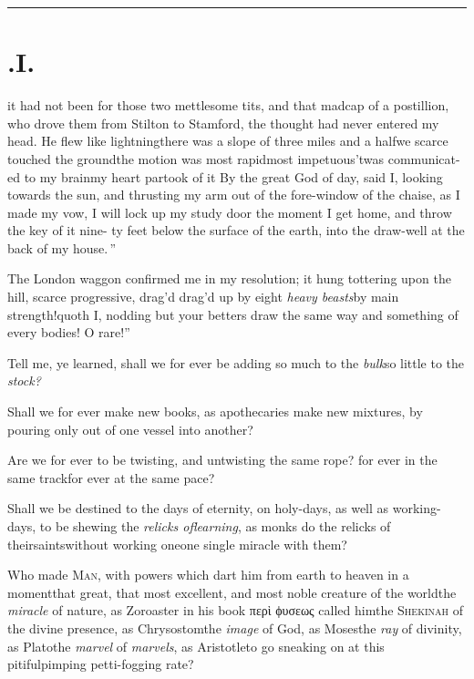 \documentclass{article}
\begin{document}
\bigskip

\hrule

\section{.\enspace  I.}

 it had not been for those two\break
mettlesome tits, and that madcap of\break
a postillion, who drove them
from Stilton to Stamford, the thought had never entered my head. He
flew like lightning\tsh there was a slope of three miles
and a half\tsh we scarce touched the
ground\tsh the motion was most rapid\break\tsk most
impetuous\tsh ’twas communicat- ed to my
brain\tsk my heart partook of it\break
\tsh By the great God of day, said I, looking towards the
sun, and thrusting my arm out of the fore-window of the
chaise, as I made my vow, \lqq I will\break
lock up my study door the moment I\break
get home, and throw the key of it nine-\break
ty feet below the surface of the earth,\break
into the draw-well at the back of my\break
house.\,”

The London waggon confirmed me in my resolution; it hung
tottering upon the hill, scarce progressive, drag’d\tsk
drag’d up by eight \textit{heavy beasts}\tsk \lqq by main
strength!\tsk quoth I, nodding\tsk\break
but your betters draw the same way\tsk\break
and something of every bodies!\tsh\break
O rare!”

Tell me, ye learned, shall we for ever be adding so much to the
\textit{bulk}\tsk so little to the \textit{stock?}

Shall we for ever make new books, as apothecaries make new
mixtures, by pouring only out of one vessel into another?

Are we for ever to be twisting, and untwisting the same rope?
for ever in the same track\tsk for ever at the same pace?

Shall we be destined to the days of eternity, on holy-days, as
well as work\-ing-days, to be shewing the \textit{relicks
of\break learning},
as monks do the relicks of their\break saints\tsk without working
one\tsk one single miracle with them?

Who made \textsc{Man}, with powers which dart him from earth to heaven in a moment\tsk that
great, that most excellent, and most noble creature of the world\tsk the
\textit{miracle} of nature, as Zoroaster in his book {\small
περὶ ϕυσεως} called him\tsk the
\textsc{She\-kinah} of the divine presence, as Chry\-sostom\tsh the \textit{image}
of God, as Moses\tsh the \textit{ray} of divinity, as Plato\tsk the \textit{marvel} of
\textit{marvels}, as Aristotle\tsk to go sneaking on at this
pitiful\tsk pimping\tsk
petti-\break fogging rate?
\end{document}
